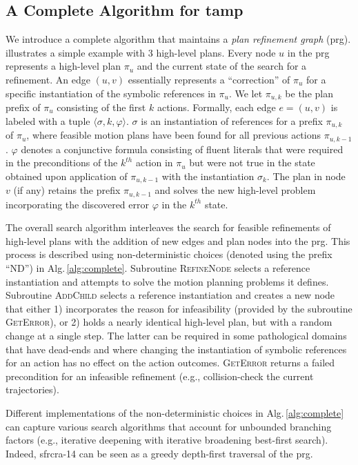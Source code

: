 \subsection{A Complete Algorithm for {\sc tamp}}
We introduce a complete algorithm that maintains a \emph{plan
  refinement graph} ({\sc prg}).  illustrates a simple
example with 3 high-level plans.  Every node $u$ in the {\sc prg} represents
a high-level plan $\pi_u$ and the current state of the search for a
refinement. An edge $(u,v)$ essentially represents a ``correction'' of
$\pi_u$ for a specific instantiation of the symbolic references in
$\pi_u$. We let $\pi_{u,k}$ be the plan prefix of $\pi_u$ consisting
of the first $k$ actions. Formally, each edge $e=(u,v)$ is labeled
with a tuple $\langle \sigma, k, \varphi \rangle$.  $\sigma$ is an
instantiation of references for a prefix $\pi_{u,k}$ of $\pi_u$, where
feasible motion plans have been found for all previous actions
$\pi_{u,k-1}$. $\varphi$ denotes a conjunctive formula consisting of
fluent literals that were required in the preconditions of the
$k^{th}$ action in $\pi_u$ but were not true in the state obtained
upon application of $\pi_{u,k-1}$ with the instantiation $\sigma_k$.
The plan in node $v$ (if any) retains the prefix $\pi_{u,k-1}$ and
solves the new high-level problem incorporating the discovered
error $\varphi$ in the $k^{th}$ state.

The overall search algorithm interleaves the search for feasible
refinements of high-level plans with the addition of new edges and plan
nodes into the {\sc prg}. This process is described using
non-deterministic choices (denoted using the prefix ``ND'') in
Alg.\,\ref{alg:complete}. Subroutine \textsc{RefineNode} selects a
reference instantiation and attempts to solve the motion planning
problems it defines. Subroutine \textsc{AddChild} selects a reference
instantiation and creates a new node that either 1) incorporates the
reason for infeasibility (provided by the subroutine
\textsc{GetError}), or 2) holds a nearly identical high-level plan,
but with a random change at a single step.  The latter can be required
in some pathological domains that have dead-ends and where changing
the instantiation of symbolic references for an action has no effect
on the action outcomes. \textsc{GetError} returns a failed
precondition for an infeasible refinement (e.g., collision-check
the current trajectories).

Different implementations of the non-deterministic choices in
Alg.\,\ref{alg:complete} can capture various search algorithms that
account for unbounded branching factors (e.g., iterative deepening
with iterative broadening best-first search). Indeed, {\sc sfrcra-14}
can be seen as a greedy depth-first traversal of the {\sc prg}.

